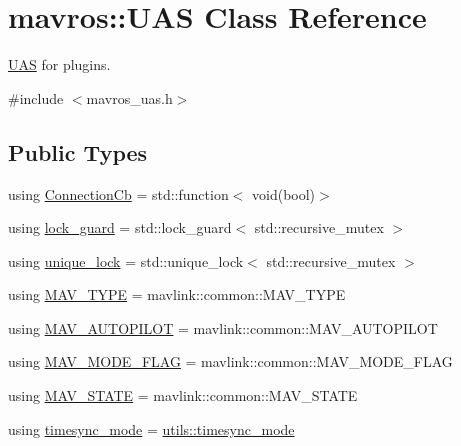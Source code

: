 \hypertarget{classmavros_1_1UAS}{}\section{mavros\+::U\+AS Class Reference}
\label{classmavros_1_1UAS}


\mbox{\hyperlink{classmavros_1_1UAS}{U\+AS}} for plugins.  




{\ttfamily \#include $<$mavros\+\_\+uas.\+h$>$}

\subsection*{Public Types}
\begin{DoxyCompactItemize}
\item 
using \mbox{\hyperlink{group__nodelib_gae26d7ffaa66c0d7996857ca12600dab5}{Connection\+Cb}} = std\+::function$<$ void(bool)$>$
\item 
using \mbox{\hyperlink{group__nodelib_ga823ce64cc07d60ff4b1405ca4e4b4e89}{lock\+\_\+guard}} = std\+::lock\+\_\+guard$<$ std\+::recursive\+\_\+mutex $>$
\item 
using \mbox{\hyperlink{group__nodelib_ga8452368668995b87dd0cd51d4193c9ad}{unique\+\_\+lock}} = std\+::unique\+\_\+lock$<$ std\+::recursive\+\_\+mutex $>$
\item 
using \mbox{\hyperlink{group__nodelib_ga96b408110c3646b92bef49d32ed1c84b}{M\+A\+V\+\_\+\+T\+Y\+PE}} = mavlink\+::common\+::\+M\+A\+V\+\_\+\+T\+Y\+PE
\item 
using \mbox{\hyperlink{group__nodelib_gab6b5a708dff72c3923fd71d8d4730e3e}{M\+A\+V\+\_\+\+A\+U\+T\+O\+P\+I\+L\+OT}} = mavlink\+::common\+::\+M\+A\+V\+\_\+\+A\+U\+T\+O\+P\+I\+L\+OT
\item 
using \mbox{\hyperlink{group__nodelib_gaa4ceb4f80ab2af120df172fcb47a7d65}{M\+A\+V\+\_\+\+M\+O\+D\+E\+\_\+\+F\+L\+AG}} = mavlink\+::common\+::\+M\+A\+V\+\_\+\+M\+O\+D\+E\+\_\+\+F\+L\+AG
\item 
using \mbox{\hyperlink{group__nodelib_ga85bd5a7930c4de36d657e1f8b890e19f}{M\+A\+V\+\_\+\+S\+T\+A\+TE}} = mavlink\+::common\+::\+M\+A\+V\+\_\+\+S\+T\+A\+TE
\item 
using \mbox{\hyperlink{group__nodelib_ga866822300d407c623943a069e0db494a}{timesync\+\_\+mode}} = \mbox{\hyperlink{group__mavutils_gac7f53712a7627f397d0eb145c2a16cf7}{utils\+::timesync\+\_\+mode}}
\end{DoxyCompactItemize}
